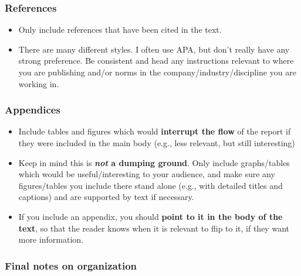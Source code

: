 \documentclass[
  openany]{book}
\providecommand{\tightlist}{%
  \setlength{\itemsep}{0pt}\setlength{\parskip}{0pt}}
\begin{document}
\hypertarget{referencesreport}{%
\subsubsection{References}\label{referencesreport}}

\begin{itemize}
\tightlist
\item
  Only include references that have been cited in the text.
\item
  There are many different styles. I often use APA, but don't really have any strong preference. Be consistent and head any instructions relevant to where you are publishing and/or norms in the company/industry/discipline you are working in.
\end{itemize}

\hypertarget{appreport}{%
\subsubsection{Appendices}\label{appreport}}

\begin{itemize}
\tightlist
\item
  Include tables and figures which would \textbf{interrupt the flow} of the report if they were included in the main body (e.g., less relevant, but still interesting)
\item
  Keep in mind this is \textbf{\emph{not} a dumping ground}. Only include graphs/tables which would be useful/interesting to your audience, and make sure any figures/tables you include there stand alone (e.g., with detailed titles and captions) and are supported by text if necessary.
\item
  If you include an appendix, you should \textbf{point to it in the body of the text}, so that the reader knows when it is relevant to flip to it, if they want more information.
\end{itemize}

\hypertarget{final-notes-on-organization}{%
\subsubsection{Final notes on organization}\label{final-notes-on-organization}}
\end{document}
